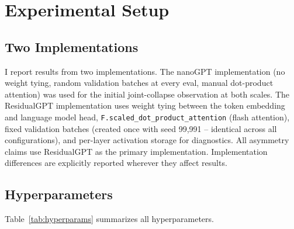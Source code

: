 \documentclass[11pt]{article}
\begin{document}
\section{Experimental Setup}
\subsection{Two Implementations}
I report results from two implementations. The nanoGPT implementation (no weight tying, random validation batches at every eval, manual dot-product attention) was used for the initial joint-collapse observation at both scales. The ResidualGPT implementation uses weight tying between the token embedding and language model head, \texttt{F.scaled\_dot\_product\_attention} (flash attention), fixed validation batches (created once with seed 99{,}991 -- identical across all configurations), and per-layer activation storage for diagnostics. All asymmetry claims use ResidualGPT as the primary implementation. Implementation differences are explicitly reported wherever they affect results.

\subsection{Hyperparameters}
Table~\ref{tab:hyperparams} summarizes all hyperparameters.

\begin{table}[H]
\centering
\small
\caption{Hyperparameters for all experiments.}
\label{tab:hyperparams}
\end{table}
\end{document}
